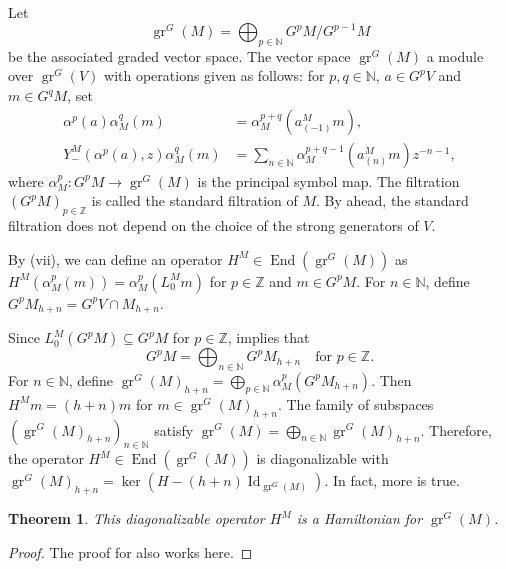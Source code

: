 \documentclass[a4paper, 12pt, reqno]{amsart}
\newtheorem{theorem}{Theorem}[section]
\theoremstyle{remark}
\numberwithin{equation}{subsection}
\DeclareMathOperator{\Id}{Id}
\DeclareMathOperator{\gr}{gr}
\DeclareMathOperator{\End}{End}
\begin{document}
Let
\begin{equation*}
  \gr^G(M) = \bigoplus_{p \in \mathbb{N}}G^pM/G^{p - 1}M
\end{equation*}
be the associated graded vector space.
The vector space $\gr^G(M)$ a module over $\gr^G(V)$ with operations given as follows: for $p, q \in \mathbb{N}$, $a \in G^pV$ and $m \in G^qM$, set
\begin{align*}
  \alpha^p(a)\alpha_M^q(m) &= \alpha_M^{p + q}(a^M_{(-1)}m), \\
  Y^M_-(\alpha^p(a), z)\alpha_M^q(m) &= \sum_{n \in \mathbb{N}}\alpha_M^{p + q - 1}(a^M_{(n)}m)z^{-n - 1},
\end{align*}
where $\alpha_M^p: G^pM \to \gr^G(M)$ is the principal symbol map.
The filtration $(G^pM)_{p \in \mathbb{Z}}$ is called the standard filtration of $M$.
By  ahead, the standard filtration does not depend on the choice of the strong generators of $V$.

By (vii), we can define an operator $H^M \in \End(\gr^G(M))$ as $H^M(\alpha_M^p(m)) = \alpha_M^p(L^M_0m)$ for $p \in \mathbb{Z}$ and $m \in G^pM$.
For $n \in \mathbb{N}$, define $G^pM_{h + n} = G^pV \cap M_{h + n}$.

Since $L_0^M(G^pM) \subseteq G^pM$ for $p \in \mathbb{Z}$,  implies that
\begin{equation}
  \label{eq:51}
  G^pM = \bigoplus_{n \in \mathbb{N}}G^pM_{h + n} \quad \text{for }p \in \mathbb{Z}.
\end{equation}
For $n \in \mathbb{N}$, define $\gr^G(M)_{h + n} = \bigoplus_{p \in \mathbb{N}}\alpha_M^p(G^pM_{h + n})$.
Then $H^Mm = (h + n)m$ for $m \in \gr^G(M)_{h + n}$.
The family of subspaces $(\gr^G(M)_{h + n})_{n \in \mathbb{N}}$ satisfy $\gr^G(M) = \bigoplus_{n \in \mathbb{N}} \gr^G(M)_{h + n}$.
Therefore, the operator $H^M \in \End(\gr^G(M))$ is diagonalizable with $\gr^G(M)_{h + n} = \ker(H - (h + n)\Id_{\gr^G(M)})$.
In fact, more is true.

\begin{theorem}
  \label{thr:49}
  This diagonalizable operator $H^M$ is a Hamiltonian for $\gr^G(M)$.
\end{theorem}

\begin{proof}
  The proof for  also works here.
\end{proof}
\end{document}
